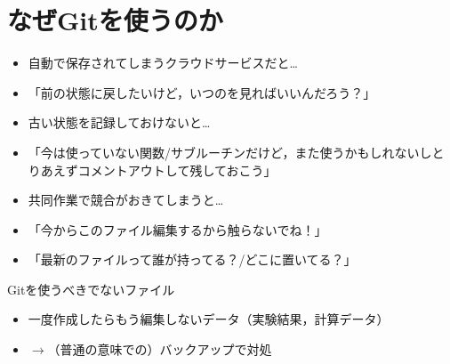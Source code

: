 \documentclass[12pt,dvipdfmx,svgnames,uplatex,aspectratio=169]{beamer}
\begin{document}
\section{なぜGitを使うのか}
\begin{frame}{\insertsection}
  \begin{itemize}
    \item 自動で保存されてしまうクラウドサービスだと…
    \item[] 「前の状態に戻したいけど，いつのを見ればいいんだろう？」
    \item 古い状態を記録しておけないと…
    \item[] 「今は使っていない関数/サブルーチンだけど，また使うかもしれないしとりあえずコメントアウトして残しておこう」
    \item 共同作業で競合がおきてしまうと…
    \item[] 「今からこのファイル編集するから触らないでね！」
    \item[] 「最新のファイルって誰が持ってる？/どこに置いてる？」
  \end{itemize}

  \pause
  \begin{block}{Gitを使うべきでないファイル}
    \begin{itemize}
      \item 一度作成したらもう編集しないデータ（実験結果，計算データ）
      \item[] \(\to\)（普通の意味での）バックアップで対処
    \end{itemize}
  \end{block}
\end{frame}
\end{document}
